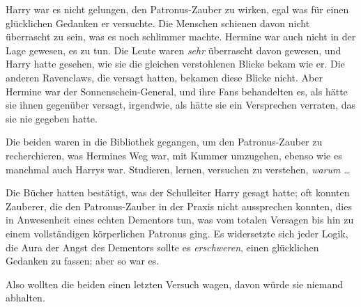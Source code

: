 Harry war es nicht gelungen, den Patronus-Zauber zu wirken, egal was für einen glücklichen Gedanken er versuchte. Die Menschen schienen davon nicht überrascht zu sein, was es noch schlimmer machte. Hermine war auch nicht in der Lage gewesen, es zu tun. Die Leute waren \emph{sehr} überrascht davon gewesen, und Harry hatte gesehen, wie sie die gleichen verstohlenen Blicke bekam wie er. Die anderen Ravenclaws, die versagt hatten, bekamen diese Blicke nicht. Aber Hermine war der Sonnenschein-General, und ihre Fans behandelten es, als hätte sie ihnen gegenüber versagt, irgendwie, als hätte sie ein Versprechen verraten, das sie nie gegeben hatte.

Die beiden waren in die Bibliothek gegangen, um den Patronus-Zauber zu recherchieren, was Hermines Weg war, mit Kummer umzugehen, ebenso wie es manchmal auch Harrys war. Studieren, lernen, versuchen zu verstehen, \emph{warum} …

Die Bücher hatten bestätigt, was der Schulleiter Harry gesagt hatte; oft konnten Zauberer, die den Patronus-Zauber in der Praxis nicht aussprechen konnten, dies in Anwesenheit eines echten Dementors tun, was vom totalen Versagen bis hin zu einem vollständigen körperlichen Patronus ging. Es widersetzte sich jeder Logik, die Aura der Angst des Dementors sollte es \emph{erschweren}, einen glücklichen Gedanken zu fassen; aber so war es.

Also wollten die beiden einen letzten Versuch wagen, davon würde sie niemand abhalten.

